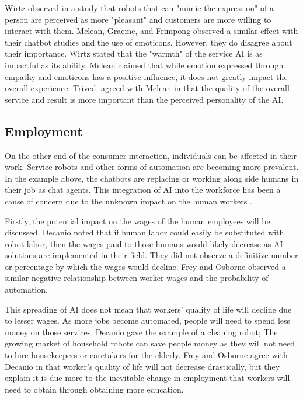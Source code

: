 \documentclass[12pt, man]{apa6}
\begin{document}
Wirtz \parencite*{Wirtz2018} observed in a study that robots that can "mimic the expression" of a person are perceived as more "pleasant" and customers are more willing to interact with them.  Mclean, Graeme, and Frimpong \parencite*{McLean2017494} observed a similar effect with their chatbot studies and the use of emoticons.  However, they do disagree about their importance.  Wirtz \parencite*[]{Wirtz2018} stated that the "warmth" of the service AI is as impactful as its ability.  Mclean \parencite*[]{McLean2017494} claimed that while emotion expressed through empathy and emoticons has a positive influence, it does not greatly impact the overall experience.  Trivedi \parencite*{Trivedi201991} agreed with Mclean in that the quality of the overall service and result is more important than the perceived personality of the AI.

\subsection*{Employment}
On the other end of the consumer interaction, individuals can be affected in their work.  Service robots and other forms of automation are becoming more prevalent. In the example above, the chatbots are replacing or working along side humans in their job as chat agents.  This integration of AI into the workforce has been a cause of concern due to the unknown impact on the human workers \parencite{DeCanio2016280}.

Firstly, the potential impact on the wages of the human employees will be discussed.  Decanio \parencite*[]{DeCanio2016280} noted that if human labor could easily be substituted with robot labor, then the wages paid to those humans would likely decrease as AI solutions are implemented in their field.  They did not observe a definitive number or percentage by which the wages would decline.  Frey and Osborne \parencite*[]{Frey2017} observed a similar negative relationship between worker wages and the probability of automation.

This spreading of AI does not mean that workers' quality of life will decline due to lesser wages.  As more jobs become automated, people will need to spend less money on those services.  Decanio \parencite*[]{DeCanio2016280} gave the example of a cleaning robot; The growing market of household robots can save people money as they will not need to hire housekeepers or caretakers for the elderly.  Frey and Osborne agree with Decanio in that worker's quality of life will not decrease drastically, but they explain it is due more to the inevitable change in employment that workers will need to obtain through obtaining more education.
\end{document}
